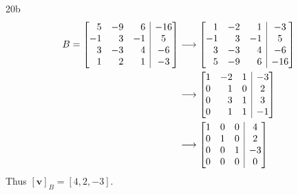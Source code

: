 \documentclass{article}
\makeatletter
\theoremstyle{definition}
\newenvironment{amatrix}[1]{%
	\left[\begin{array}{@{}*{#1}{r}|c@{}}
	}{%
	\end{array}\right]
}
\makeatother
\begin{document}
    
    \begin{prob}{20b} $  $
    	\begin{align*}
    		B =
    			\begin{amatrix}{3}
    				5 & -9 & 6 & -16 \\
    				-1 & 3 & -1 & 5 \\
    				3 & -3 & 4 & -6 \\
    				1 & 2 & 1 & -3
    			\end{amatrix}
    		&\longrightarrow
    			\begin{amatrix}{3}
    				1 & -2 & 1 & -3 \\
    				-1 & 3 & -1 & 5 \\
    				3 & -3 & 4 & -6 \\
    				5 & -9 & 6 & -16
    			\end{amatrix} \\
    		&\longrightarrow
    			\begin{amatrix}{3}
    				1 & -2 & 1 & -3 \\
    				0 & 1 & 0 & 2 \\
    				0 & 3 & 1 & 3 \\
    				0 & 1 & 1 & -1
    			\end{amatrix} \\
    		&\longrightarrow
    			\begin{amatrix}{3}
    				1 & 0 & 0 & 4 \\
    				0 & 1 & 0 & 2 \\
    				0 & 0 & 1 & -3 \\
    				0 & 0 & 0 & 0
    			\end{amatrix}
    	\end{align*}
    	Thus $ [\mathbf{v}]_B = [4,2,-3] $.\\
    \end{prob}
    
\end{document}
